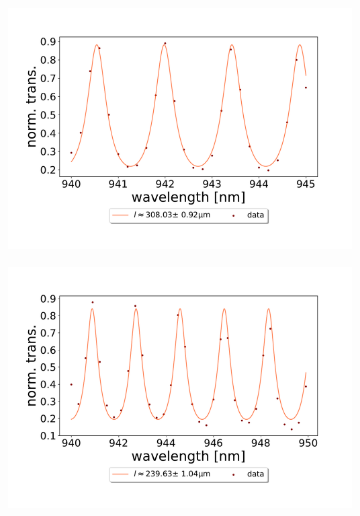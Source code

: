 \begin{figure}[h!]
\begin{subfigure}[b]{0.49\textwidth}
        \label{fig:550um_M3:M5_FSR_scan}
    \end{subfigure}
    \begin{subfigure}[b]{0.49\textwidth}
        \includegraphics[width=\textwidth]{figures/results/double fano fits/320um_M3:M5_FSR_scan.pdf}
        \caption{}
        \label{fig:320um_M3:M5_FSR_scan}
    \end{subfigure}
    \begin{subfigure}[b]{0.49\textwidth}
        \includegraphics[width=\textwidth]{figures/results/double fano fits/250um_M3:M5_FSR_scan.pdf}
        \caption{}
        \label{fig:250um_M3:M5_FSR_scan}
    \end{subfigure}
    \begin{subfigure}[b]{0.49\textwidth}

\end{subfigure}
\end{figure}
